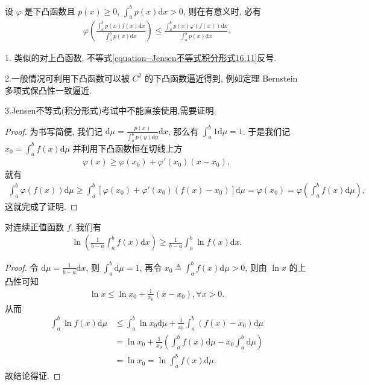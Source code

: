 \documentclass[../../main.tex]{subfiles}%
\begin{document}
\begin{theorem}\label{theorem:Jensen不等式积分形式}
设 $\varphi$ 是下凸函数且 $p(x) \geqslant 0$, $\int_a^b p(x) \mathrm{d}x > 0$, 则在有意义时, 必有
\begin{align}\label{equation--Jensen不等式积分形式16.11}
\varphi\left(\frac{\int_a^b p(x)f(x)\mathrm{d}x}{\int_a^b p(x)\mathrm{d}x}\right) \leqslant \frac{\int_a^b p(x)\varphi(f(x))\mathrm{d}x}{\int_a^b p(x)\mathrm{d}x}.
\end{align}
\end{theorem}
\begin{note}
1. 类似的对上凸函数, 不等式\eqref{equation--Jensen不等式积分形式16.11}反号.

2.一般情况可利用下凸函数可以被 $C^2$ 的下凸函数逼近得到, 例如定理 Bernstein 多项式保凸性一致逼近. 

3.Jensen不等式(积分形式)考试中不能直接使用,需要证明.
\end{note}
\begin{proof}

为书写简便, 我们记 $\mathrm{d}\mu = \frac{p(x)}{\int_a^b p(y)\mathrm{d}y}\mathrm{d}x$, 那么有 $\int_a^b 1\mathrm{d}\mu = 1$. 于是我们记 $x_0 = \int_a^b f(x)\mathrm{d}\mu$ 并利用下凸函数恒在切线上方
\begin{align*}
\varphi(x) \geqslant \varphi(x_0) + \varphi'(x_0)(x - x_0),
\end{align*}
就有
\begin{align*}
\int_a^b \varphi(f(x))\mathrm{d}\mu \geqslant \int_a^b [\varphi(x_0) + \varphi'(x_0)(f(x) - x_0)]\mathrm{d}\mu = \varphi(x_0) = \varphi\left(\int_a^b f(x)\mathrm{d}\mu\right),
\end{align*}
这就完成了证明. 

\end{proof}

\begin{example}
对连续正值函数 $f$, 我们有
\begin{align*}
\ln\left(\frac{1}{b - a}\int_a^b f(x)\mathrm{d}x\right) \geqslant \frac{1}{b - a}\int_a^b \ln f(x)\mathrm{d}x.
\end{align*} 
\end{example}
\begin{proof}

令 $\mathrm{d}\mu = \frac{1}{b - a}\mathrm{d}x$, 则 $\int_a^b \mathrm{d}\mu = 1$, 再令 $x_0 \triangleq \int_a^b f(x) \mathrm{d}\mu>0$, 则由 $\ln x$ 的上凸性可知
\begin{align*}
\ln x \leqslant \ln x_0 + \frac{1}{x_0}(x - x_0), \forall x > 0.
\end{align*}
从而
\begin{align*}
\int_a^b \ln f(x) \mathrm{d}\mu &\leqslant \int_a^b \ln x_0 \mathrm{d}\mu + \frac{1}{x_0}\int_a^b (f(x) - x_0) \mathrm{d}\mu \\
&= \ln x_0 + \frac{1}{x_0}\left(\int_a^b f(x) \mathrm{d}\mu - x_0\int_a^b \mathrm{d}\mu\right) \\
&= \ln x_0 = \ln \int_a^b f(x) \mathrm{d}\mu.
\end{align*}
故结论得证.

\end{proof}
\end{document}
